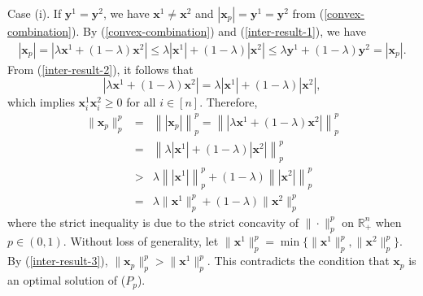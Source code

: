 \documentclass[12pt]{article}
\begin{document}
Case (i). If $\mathbf{y}^1=\mathbf{y}^2$, we have  $\mathbf{x}^1\neq\mathbf{x}^2$ and $|\mathbf{x}_p|=\mathbf{y}^1=\mathbf{y}^2$ from (\ref{convex-combination}). By (\ref{convex-combination}) and (\ref{inter-result-1}), we have
\begin{eqnarray}\label{inter-result-2}
|\mathbf{x}_p|=|\lambda\mathbf{x}^1+(1-\lambda)\mathbf{x}^2|\leqslant\lambda|\mathbf{x}^1|+(1-\lambda)|\mathbf{x}^2|
\leqslant\lambda\mathbf{y}^1+(1-\lambda)\mathbf{y}^2=|\mathbf{x}_p|.
\end{eqnarray}
From (\ref{inter-result-2}), it follows that $$|\lambda\mathbf{x}^1+(1-\lambda)\mathbf{x}^2|=\lambda|\mathbf{x}^1|+(1-\lambda)|\mathbf{x}^2|,$$ which implies $\mathbf{x}^1_i\mathbf{x}^2_i\geqslant 0$ for all $i\in [n]$. Therefore,
\begin{eqnarray}\label{inter-result-3}
\|\mathbf{x}_p\|_{p}^{p}&=&\left\||\mathbf{x}_p|\right\|_{p}^{p}=\left\||\lambda\mathbf{x}^1+(1-\lambda)\mathbf{x}^2|\right\|_{p}^{p}\nonumber\\ &=&\left\|\lambda|\mathbf{x}^1|+(1-\lambda)|\mathbf{x}^2|\right\|_{p}^{p}\nonumber\\
&>&\lambda\left\||\mathbf{x}^1|\right\|_{p}^{p}+(1-\lambda)\left\||\mathbf{x}^2|\right\|_{p}^{p}\nonumber\\
&=&\lambda\|\mathbf{x}^1\|_{p}^{p}+(1-\lambda)\|\mathbf{x}^2\|_{p}^{p}
\end{eqnarray}
where the strict inequality is due to the strict concavity of $\|\cdot\|_{p}^{p}$ on
$\mathbb{R}^n_{+}$ when $p\in (0,1)$. Without loss of generality, let $\|\mathbf{x}^1\|_{p}^{p}=\min\{\|\mathbf{x}^1\|_{p}^{p},\|\mathbf{x}^2\|_{p}^{p}\}$. By {\rm(\ref{inter-result-3})}, $\|\mathbf{x}_p\|_{p}^{p}>\|\mathbf{x}^1\|_{p}^{p}$. This contradicts the condition that $\mathbf{x}_p$
is an optimal solution of {\rm($P_p$)}.
\end{document}
